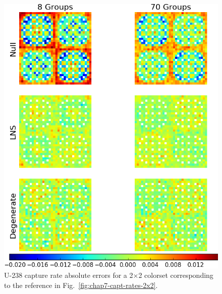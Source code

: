 \begin{appendices}
\clearpage

\begin{figure}[h!]
\centering
\includegraphics[width=\linewidth]{figures/patterns/appendix/2x2/capt-err}
\vspace{2mm}
\caption[U-238 capture rate absolute errors for a 2$\times$2 periodic colorset]{U-238 capture rate absolute errors for a 2$\times$2 colorset corresponding to the reference in Fig.~\ref{fig:chap7-capt-rates-2x2}.}
\label{fig:lns-2x2-capt-err-abs}
\end{figure}

\clearpage


\end{appendices}
